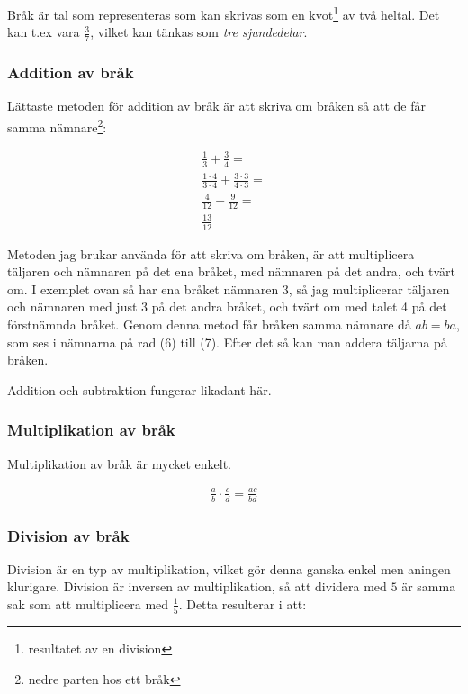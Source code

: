 Bråk är tal som representeras som kan skrivas som en kvot\footnote{resultatet av en division} av två heltal. Det kan t.ex vara $\frac{3}{7}$, vilket kan tänkas som  \textit{tre sjundedelar}.

\subsubsection{Addition av bråk}
\label{Addition av bråk}
Lättaste metoden för addition av bråk är att skriva om bråken så att de får samma nämnare\footnote{nedre parten hos ett bråk}:

\begin{align}
	\frac{1}{3} + \frac{3}{4} = \\
	\frac{1\cdot 4}{3\cdot 4} + \frac{3\cdot 3}{4\cdot 3} = \\
	\frac{4}{12} + \frac{9}{12} = \\
	\frac{13}{12}
\end{align}

Metoden jag brukar använda för att skriva om bråken, är att multiplicera täljaren och nämnaren på det ena bråket, med nämnaren på det andra, och tvärt om. I exemplet ovan så har ena bråket nämnaren 3, så jag multiplicerar täljaren och nämnaren med just 3 på det andra bråket, och tvärt om med talet 4 på det förstnämnda bråket. Genom denna metod får bråken samma nämnare då $ab = ba$, som ses i nämnarna på rad (6) till (7). Efter det så kan man addera täljarna på bråken.

Addition och subtraktion fungerar likadant här.

\subsubsection{Multiplikation av bråk}

Multiplikation av bråk är mycket enkelt.

\begin{align}
	\frac{a}{b} \cdot \frac{c}{d} = \frac{ac}{bd}
\end{align}

\subsubsection{Division av bråk}
\label{Division av bråk}

Division är en typ av multiplikation, vilket gör denna ganska enkel men aningen klurigare. Division är inversen av multiplikation, så att dividera med $5$ är samma sak som att multiplicera med $\frac{1}{5}$. Detta resulterar i att:

